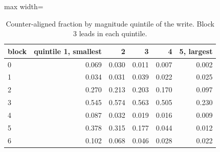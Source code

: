 \begin{table}[H]\centering\small
\caption{Counter-aligned fraction by magnitude quintile of the write. Block 3 leads in each quintile.}\label{app:quint}
\begin{adjustbox}{max width=\linewidth}
\begin{tabular}{lrrrrr}\toprule
block & quintile 1, smallest & 2 & 3 & 4 & 5, largest \\ \midrule
0 & 0.069 & 0.030 & 0.011 & 0.007 & 0.002 \\
1 & 0.034 & 0.031 & 0.039 & 0.022 & 0.025 \\
2 & 0.270 & 0.213 & 0.203 & 0.170 & 0.097 \\
3 & 0.545 & 0.574 & 0.563 & 0.505 & 0.230 \\
4 & 0.087 & 0.032 & 0.019 & 0.016 & 0.009 \\
5 & 0.378 & 0.315 & 0.177 & 0.044 & 0.012 \\
6 & 0.102 & 0.068 & 0.046 & 0.028 & 0.022 \\
\bottomrule\end{tabular}\end{adjustbox}
\end{table}
